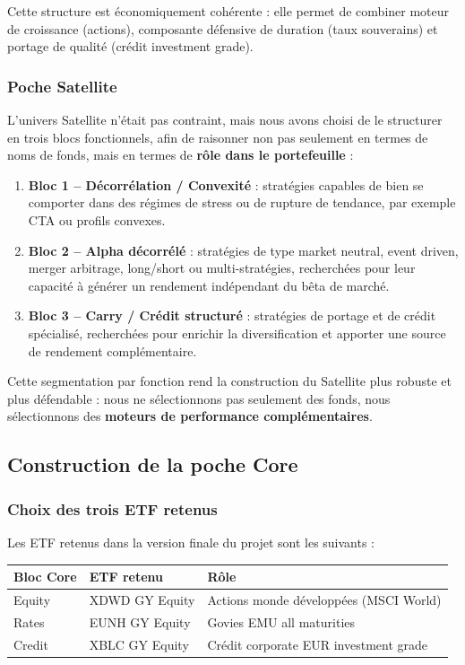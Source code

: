 \documentclass{article}
\begin{document}
Cette structure est économiquement cohérente : elle permet de combiner moteur de croissance (actions), composante défensive de duration (taux souverains) et portage de qualité (crédit investment grade).

\subsubsection{Poche Satellite}

L’univers Satellite n’était pas contraint, mais nous avons choisi de le structurer en trois blocs fonctionnels, afin de raisonner non pas seulement en termes de noms de fonds, mais en termes de \textbf{rôle dans le portefeuille} :

\begin{enumerate}
    \item \textbf{Bloc 1 -- Décorrélation / Convexité} : stratégies capables de bien se comporter dans des régimes de stress ou de rupture de tendance, par exemple CTA ou profils convexes.
    \item \textbf{Bloc 2 -- Alpha décorrélé} : stratégies de type market neutral, event driven, merger arbitrage, long/short ou multi-stratégies, recherchées pour leur capacité à générer un rendement indépendant du bêta de marché.
    \item \textbf{Bloc 3 -- Carry / Crédit structuré} : stratégies de portage et de crédit spécialisé, recherchées pour enrichir la diversification et apporter une source de rendement complémentaire.
\end{enumerate}

Cette segmentation par fonction rend la construction du Satellite plus robuste et plus défendable : nous ne sélectionnons pas seulement des fonds, nous sélectionnons des \textbf{moteurs de performance complémentaires}.

\subsection{Construction de la poche Core}

\subsubsection{Choix des trois ETF retenus}

Les ETF retenus dans la version finale du projet sont les suivants :
\begin{center}
\begin{tabular}{lll}
\hline
\textbf{Bloc Core} & \textbf{ETF retenu} & \textbf{Rôle} \\
\hline
Equity & XDWD GY Equity & Actions monde développées (MSCI World) \\
Rates & EUNH GY Equity & Govies EMU all maturities \\
Credit & XBLC GY Equity & Crédit corporate EUR investment grade \\
\hline
\end{tabular}
\end{center}
\end{document}

